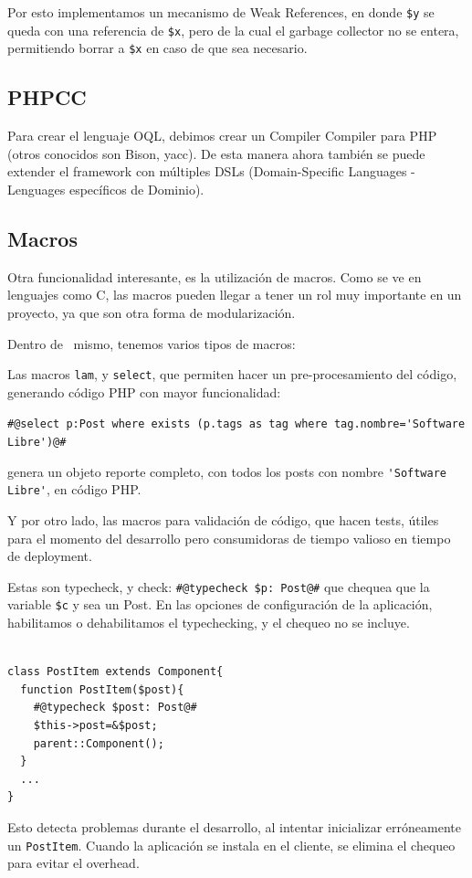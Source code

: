 Por esto implementamos un mecanismo de Weak References, en donde \verb"$y" se queda con una referencia de \verb"$x", pero de la cual el garbage collector no se entera, permitiendo borrar a \verb"$x" en caso de que sea necesario.

\subsection{PHPCC}
\label{sub-phpcc}
Para crear el lenguaje OQL, debimos crear un Compiler Compiler para PHP (otros conocidos son Bison\cite{BISON}, yacc\cite{YACC}).
De esta manera ahora también se puede extender el framework con múltiples DSLs (Domain-Specific Languages - Lenguages específicos de Dominio).

\subsection{Macros}
\label{sub-macros}
Otra funcionalidad interesante, es la utilización de macros. Como se ve en lenguajes como C, las macros pueden llegar a tener un rol muy importante en un proyecto, ya que son otra forma de modularización.

Dentro de \PWB \ mismo, tenemos varios tipos de macros:

Las macros \verb"lam", y \verb"select", que permiten hacer un pre-procesamiento del código, generando código PHP con mayor funcionalidad:

\verb"#@select p:Post where exists (p.tags as tag where tag.nombre='Software Libre')@#"%

genera un objeto reporte completo, con todos los posts con nombre \verb"'Software Libre'", en código PHP.

Y por otro lado, las macros para validación de código, que hacen tests, útiles para el momento del desarrollo pero consumidoras de tiempo valioso en tiempo de deployment.

Estas son typecheck, y check:
\verb"#@typecheck $p: Post@#" %
que chequea que la variable \verb"$c" y %
 sea un Post. En las opciones de configuración de la aplicación, habilitamos o dehabilitamos el typechecking, y el chequeo no se incluye.
\begin{verbatim}

class PostItem extends Component{
  function PostItem($post){
    #@typecheck $post: Post@#
    $this->post=&$post;
    parent::Component();
  }
  ...
}
\end{verbatim}

Esto detecta problemas durante el desarrollo, al intentar inicializar erróneamente un \verb"PostItem". Cuando la aplicación se instala en el cliente, se elimina el chequeo para evitar el overhead.

